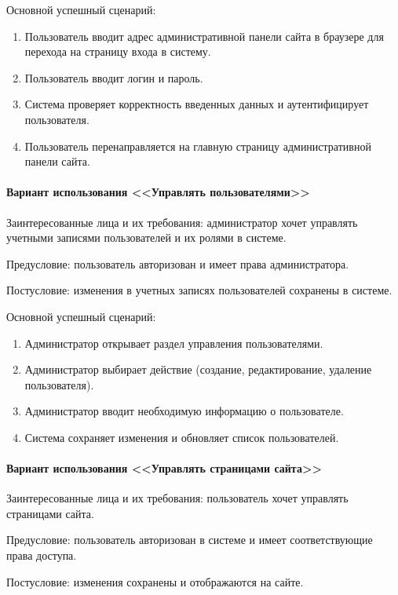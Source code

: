 Основной успешный сценарий:
\begin{enumerate}
	\item Пользователь вводит адрес административной панели сайта в браузере для перехода на страницу входа в систему.
	\item Пользователь вводит логин и пароль.
	\item Система проверяет корректность введенных данных и аутентифицирует пользователя.
	\item Пользователь перенаправляется на главную страницу административной панели сайта.
\end{enumerate}

\paragraph{Вариант использования <<Управлять пользователями>>}
Заинтересованные лица и их требования: администратор хочет управлять учетными записями пользователей и их ролями в системе.

Предусловие: пользователь авторизован и имеет права администратора.

Постусловие: изменения в учетных записях пользователей сохранены в системе.

Основной успешный сценарий:
\begin{enumerate}
	\item Администратор открывает раздел управления пользователями.
	\item Администратор выбирает действие (создание, редактирование, удаление пользователя).
	\item Администратор вводит необходимую информацию о пользователе.
	\item Система сохраняет изменения и обновляет список пользователей.
\end{enumerate}

\paragraph{Вариант использования <<Управлять страницами сайта>>}
Заинтересованные лица и их требования: пользователь хочет управлять страницами сайта.

Предусловие: пользователь авторизован в системе и имеет соответствующие права доступа.

Постусловие: изменения сохранены и отображаются на сайте.

